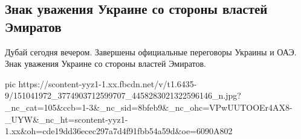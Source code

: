  
 
 
 
 

\subsection{Знак уважения Украине со стороны властей Эмиратов}

Дубай сегодня вечером. Завершены официальные переговоры Украины и ОАЭ.  Знак
уважения Украине со стороны властей Эмиратов.

\ifcmt
  pic https://scontent-yyz1-1.xx.fbcdn.net/v/t1.6435-9/151041972_3774903712599707_4458283021322596146_n.jpg?_nc_cat=105&ccb=1-3&_nc_sid=8bfeb9&_nc_ohc=VPwUUTOOEr4AX8-_UYW&_nc_ht=scontent-yyz1-1.xx&oh=cde19dd36ecec297a7d4f91fbb54a59d&oe=6090A802
\fi

